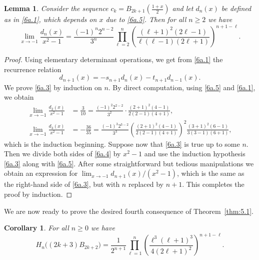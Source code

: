 \documentclass{amsart}
\theoremstyle{plain}
\newtheorem{corollary}[theorem]{Corollary}
\newtheorem{lemma}[theorem]{Lemma}
\numberwithin{equation}{section}
\begin{document}
\begin{lemma}\label{lem:6a.2}
Consider the sequence $c_k=B_{2k+1}(\tfrac{1+x}{2})$ and let $d_n(x)$ be 
defined as in \eqref{6a.1}, which depends on $x$ due to \eqref{6a.5}.
Then for all $n\geq 2$ we have
\begin{equation}\label{6a.3}
\lim_{x\to -1}\frac{d_{n}(x)}{x^{2}-1} 
= \frac{(-1)^{n}2^{n-2}}{3^{n}}\prod_{\ell=2}^n
\left(\frac{(\ell+1)^{2}(2\ell-1)}{\ell(\ell-1)(2\ell+1)}\right)^{n+1-\ell}.
\end{equation}
\end{lemma}

\begin{proof} Using elementary determinant operations, we get from 
\eqref{6a.1} the recurrence relation 
\begin{equation}\label{6a.4}
d_{n+1}(x)=-s_{n+1}d_{n}(x)-t_{n+1}d_{n-1}(x).
\end{equation}
We prove \eqref{6a.3} by induction on $n$. By direct computation, using 
\eqref{6a.5} and \eqref{6a.1}, we obtain
\begin{align*}
\lim_{x\to -1}\frac{d_{2}(x)}{x^{2}-1} &=\frac{3}{10}
=\frac{(-1)^{2}2^{2-2}}{3^{2}}\cdot\frac{(2+1)^{2}(4-1)}{2(2-1)(4+1)},\\
\lim_{x\to -1}\frac{d_{3}(x)}{x^{2}-1} &=-\frac{36}{35}
=\frac{(-1)^{3}2^{3-2}}{3^{3}}\left(\frac{(2+1)^2(4-1)}{2(2-1)(4+1)}\right)^2
\frac{(3+1)^{2}(6-1)}{3(3-1)(6+1)},
\end{align*}
which is the induction beginning. Suppose now that \eqref{6a.3} is true up to
some $n$. Then we divide both sides of \eqref{6a.4} by $x^2-1$ and use the
induction hypothesis \eqref{6a.3} along with \eqref{6a.5}. After some
straightforward but tedious manipulations we obtain an expression for 
$\lim_{x\to -1}d_{n+1}(x)/(x^2-1)$, which is the same as the right-hand side of
\eqref{6a.3}, but with $n$ replaced by $n+1$. This completes the proof by
induction.
\end{proof}

We are now ready to prove the desired fourth consequence of 
Theorem~\ref{thm:5.1}.

\begin{corollary}\label{cor:6a.3}
For all $n\geq 0$ we have
\begin{equation}\label{6a.6}
H_n\big((2k+3)B_{2k+2}\big) = \frac{1}{2^{n+1}}\prod_{\ell=1}^n
\left(\frac{\ell^{3}(\ell+1)^{3}}{4(2\ell+1)^{2}}\right)^{n+1-\ell}.
\end{equation}
\end{corollary}
\end{document}
